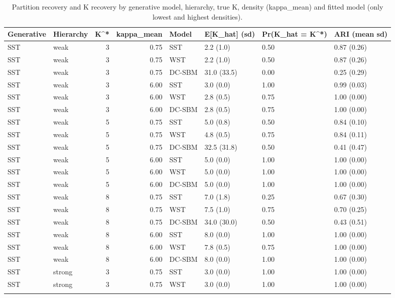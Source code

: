 \begin{table}
\centering
\caption{Partition recovery and K recovery by generative model, hierarchy, true K, density (kappa_mean) and fitted model (only lowest and highest densities).}
\centering
\begin{tabular}[t]{llrrllll}
\toprule
Generative & Hierarchy & K^* & kappa_mean & Model & E[K_hat] (sd) & Pr(K_hat = K^*) & ARI (mean sd)\\
\midrule
SST & weak & 3 & 0.75 & SST & 2.2 (1.0) & 0.50 & 0.87 (0.26)\\
SST & weak & 3 & 0.75 & WST & 2.2 (1.0) & 0.50 & 0.87 (0.26)\\
SST & weak & 3 & 0.75 & DC-SBM & 31.0 (33.5) & 0.00 & 0.25 (0.29)\\
SST & weak & 3 & 6.00 & SST & 3.0 (0.0) & 1.00 & 0.99 (0.03)\\
SST & weak & 3 & 6.00 & WST & 2.8 (0.5) & 0.75 & 1.00 (0.00)\\
\addlinespace
SST & weak & 3 & 6.00 & DC-SBM & 2.8 (0.5) & 0.75 & 1.00 (0.00)\\
SST & weak & 5 & 0.75 & SST & 5.0 (0.8) & 0.50 & 0.84 (0.10)\\
SST & weak & 5 & 0.75 & WST & 4.8 (0.5) & 0.75 & 0.84 (0.11)\\
SST & weak & 5 & 0.75 & DC-SBM & 32.5 (31.8) & 0.50 & 0.41 (0.47)\\
SST & weak & 5 & 6.00 & SST & 5.0 (0.0) & 1.00 & 1.00 (0.00)\\
\addlinespace
SST & weak & 5 & 6.00 & WST & 5.0 (0.0) & 1.00 & 1.00 (0.00)\\
SST & weak & 5 & 6.00 & DC-SBM & 5.0 (0.0) & 1.00 & 1.00 (0.00)\\
SST & weak & 8 & 0.75 & SST & 7.0 (1.8) & 0.25 & 0.67 (0.30)\\
SST & weak & 8 & 0.75 & WST & 7.5 (1.0) & 0.75 & 0.70 (0.25)\\
SST & weak & 8 & 0.75 & DC-SBM & 34.0 (30.0) & 0.50 & 0.43 (0.51)\\
\addlinespace
SST & weak & 8 & 6.00 & SST & 8.0 (0.0) & 1.00 & 1.00 (0.00)\\
SST & weak & 8 & 6.00 & WST & 7.8 (0.5) & 0.75 & 1.00 (0.00)\\
SST & weak & 8 & 6.00 & DC-SBM & 8.0 (0.0) & 1.00 & 1.00 (0.00)\\
SST & strong & 3 & 0.75 & SST & 3.0 (0.0) & 1.00 & 1.00 (0.00)\\
SST & strong & 3 & 0.75 & WST & 3.0 (0.0) & 1.00 & 1.00 (0.00)\\
\addlinespace

\end{tabular}
\end{table}
